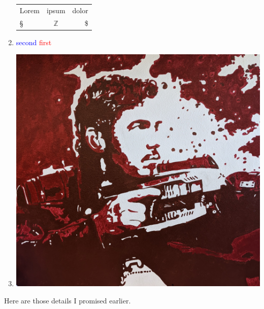 \documentclass[10pt]{article}
\begin{document}
\begin{enumerate}[(1)]
\begin{center}
\begin{tabular}{|l|c|r|}
                  \hline
                  Lorem & ipsum        & dolor \\
                  \S    & $\mathbb{Z}$ & \$    \\
                  \hline
              \end{tabular}
          \end{center}
    \item \textcolor{blue}{second} \quad \textcolor{red}{first}
    \item \includegraphics[scale=.1]{chrispratt.png}
\end{enumerate}
\newpage
\thispagestyle{fancy}
\fancyhf{}
\fancyhead[L]{\thepage}
\renewcommand{\headrulewidth}{0pt}
\hypertarget{a}{Here are those details I promised earlier.}
\end{document}
